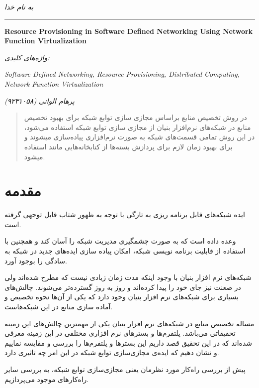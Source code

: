 ﻿\documentclass[11pt]{article}
\begin{document}
\begin{titlepage}
	\centering
	\emph{به نام خدا}\par
	\vspace{.5cm}
\rule{\textwidth}{1pt}
	\vspace{.25cm}
	\begin{latin}
		{\huge\bfseries Resource Provisioning in Software Defined Networking Using Network Function Virtualization} \par
	\end{latin}
	\vspace{.5cm}
	\emph{واژه‌های کلیدی:}
	\vspace{.1cm}
	\begin{latin}
		\emph{Software Defined Networking, Resource Provisioning, Distributed Computing, Network Function Virtualization}
	\end{latin}
	\emph{پرهام الوانی (۹۲۳۱۰۵۸)}
\end{titlepage}
\begin{abstract}
	در روش تخصیص منابع براساس مجازی سازی توابع شبکه برای بهبود تخصیص منابع در شبکه‌های نرم‌افزار بنیان از مجازی سازی توابع شبکه استفاده می‌شود، در این روش تمامی قسمت‌های شبکه به صورت نرم‌افزاری پیاده‌سازی میشوند و برای بهبود زمان لازم برای پردازش بسته‌ها از کتابخانه‌هایی مانند  استفاده میشود.
\end{abstract}
\section{مقدمه}

\par
ایده شبکه‌های قابل برنامه ریزی به تازگی با توجه به ظهور  شتاب قابل توجهی گرفته است.
\par
  وعده داده است که به صورت چشمگیری مدیریت شبکه را آسان کند و همچنین با استفاده از قابلیت برنامه نویسی شبکه، امکان پیاده سازی ایده‌های جدید در شبکه به سادگی را بوجود آورد.
\par
شبکه‌های نرم افزار بنیان با وجود اینکه مدت زمان زیادی نیست که مطرح شده‌اند ولی در صعنت نیز جای خود را پیدا کرده‌اند و روز به روز گسترده‌تر می‌شوند. چالش‌های بسیاری برای شبکه‌های نرم افزار بنیان وجود دارد که یکی از آن‌ها نحوه تخصیص و آماده سازی منابع در این شبکه‌هاست.
\par
مساله تخصیص منابع در شبکه‌های نرم افزار بنیان یکی از مهمترین چالش‌های این زمینه تحقیقاتی می‌باشد. پلتفرم‌ها و بستر‌های نرم افزاری مختلفی در این زمینه معرفی شده‌اند که در این تحقیق قصد داریم این بستر‌ها و پلتفرم‌ها را بررسی و مقایسه نماییم و نشان دهیم که ایده‌ی مجازی‌سازی توابع شبکه در این امر چه تاثیری دارد. 
\par
پیش از بررسی راه‌کار مورد نظرمان یعنی مجازی‌سازی توابع شبکه، به بررسی سایر راه‌کار‌های موجود می‌پردازیم.
\end{document}
